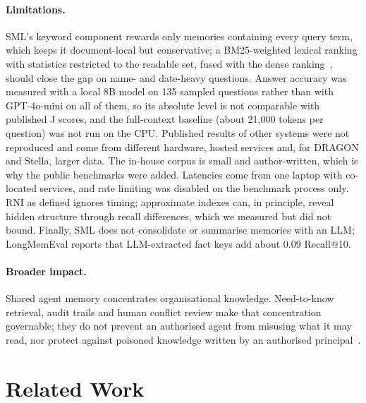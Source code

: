 \documentclass[11pt,a4paper]{article}
\theoremstyle{remark}
\newcommand{\sys}{SML}
\begin{document}
\paragraph{Limitations.} \sys{}'s keyword component rewards only memories containing every query term, which keeps it
document-local but conservative; a BM25-weighted lexical ranking with statistics restricted to the readable set, fused with
the dense ranking~\cite{cormack2009rrf}, should close the gap on name- and date-heavy questions. Answer accuracy was
measured with a local 8B model on 135 sampled questions rather than with GPT-4o-mini on all of them, so its absolute
level is not comparable with published J scores, and the full-context baseline (about 21{,}000 tokens per question) was
not run on the CPU. Published results of other systems were not reproduced and come from different hardware, hosted
services and, for DRAGON and Stella, larger data. The in-house corpus is small and author-written, which is why the public
benchmarks were added. Latencies come from one laptop with co-located services, and rate limiting was disabled on the
benchmark process only. RNI as defined ignores timing; approximate indexes can, in principle, reveal hidden structure
through recall differences, which we measured but did not bound. Finally, \sys{} does not consolidate or summarise memories
with an LLM; LongMemEval reports that LLM-extracted fact keys add about 0.09 Recall@10.

\paragraph{Broader impact.} Shared agent memory concentrates organisational knowledge. Need-to-know retrieval, audit
trails and human conflict review make that concentration governable; they do not prevent an authorised agent from
misusing what it may read, nor protect against poisoned knowledge written by an authorised principal~\cite{zou2025poisonedrag}.

\section{Related Work}
\label{sec:related}
\end{document}
